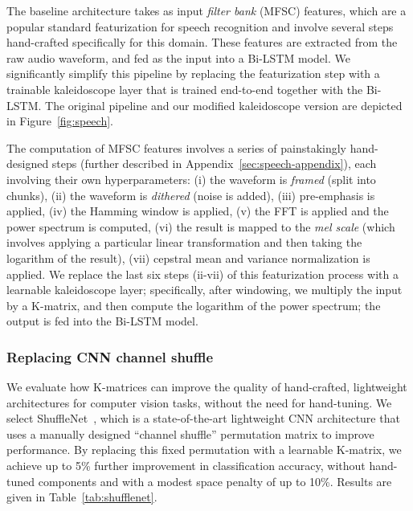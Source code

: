 The baseline architecture takes as input \textit{filter bank} (MFSC) features, which are a popular standard featurization for speech recognition \citep{paliwal1999filter} and involve several steps hand-crafted specifically for this domain. These features are extracted from the raw audio waveform, and fed as the input into a Bi-LSTM model. We significantly simplify this pipeline by replacing the featurization step with a trainable kaleidoscope layer that is trained end-to-end together with the Bi-LSTM. The original pipeline and our modified kaleidoscope version are depicted in Figure~\ref{fig:speech}.

The computation of MFSC features involves a series of painstakingly hand-designed steps (further described in Appendix~\ref{sec:speech-appendix}), each involving their own hyperparameters: (i) the waveform is \textit{framed} (split into chunks), (ii) the waveform is \emph{dithered} (noise is added), (iii) pre-emphasis is applied, (iv) the Hamming window is applied, (v) the FFT is applied and the power spectrum is computed, (vi) the result is mapped to the \textit{mel scale} (which involves applying a particular linear transformation and then taking the logarithm of the result), (vii) cepstral mean and variance normalization is applied. We replace the last six steps (ii-vii) of this featurization process with a learnable kaleidoscope layer; specifically, after windowing, we multiply the input by a K-matrix, and then compute the logarithm of the power spectrum; the output is fed into the Bi-LSTM model.

\subsubsection{Replacing CNN channel shuffle}
\label{sec:shuffle}
We evaluate how K-matrices can improve the quality of hand-crafted, lightweight architectures for computer vision tasks, without the need for hand-tuning. We select ShuffleNet~\citep{zhang2018shufflenet}, which is a state-of-the-art lightweight CNN architecture that uses a manually designed ``channel shuffle'' permutation matrix to improve performance. By replacing this fixed permutation with a learnable K-matrix, we achieve up to 5\% further improvement in classification accuracy, without hand-tuned components and with a modest space penalty of up to 10\%. Results are given in Table~\ref{tab:shufflenet}.


